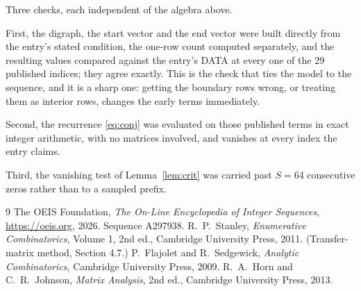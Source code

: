 \documentclass[11pt,a4paper]{article}
\theoremstyle{plain}
\theoremstyle{definition}
\begin{document}
Three checks, each independent of the algebra above.

First, the digraph, the start vector and the end vector were built directly from the
entry's stated condition, the one-row count computed separately, and the resulting values
compared against the entry's DATA at every one of the $29$ published indices; they
agree exactly. This is the check that ties the model to the sequence, and it is a sharp one:
getting the boundary rows wrong, or treating them as interior rows, changes the early terms
immediately.

Second, the recurrence \eqref{eq:conj} was evaluated on those published terms in exact
integer arithmetic, with no matrices involved, and vanishes at every index the entry claims.

Third, the vanishing test of Lemma~\ref{lem:crit} was carried past $S=64$ consecutive
zeros rather than to a sampled prefix.

\begin{thebibliography}{9}
 The OEIS Foundation, \emph{The On-Line Encyclopedia of Integer
Sequences}, \url{https://oeis.org}, 2026. Sequence A297938.
 R.~P.~Stanley, \emph{Enumerative Combinatorics}, Volume 1, 2nd ed.,
Cambridge University Press, 2011. (Transfer-matrix method, Section 4.7.)
 P.~Flajolet and R.~Sedgewick, \emph{Analytic Combinatorics}, Cambridge
University Press, 2009.
 R.~A.~Horn and C.~R.~Johnson, \emph{Matrix Analysis}, 2nd ed., Cambridge
University Press, 2013.
\end{thebibliography}
\end{document}
